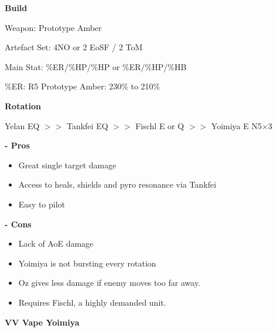 \documentclass[11pt]{article}
\begin{document}
\textbf{\small{Build}}

Weapon: Prototype Amber

Artefact Set: 4NO or 2 EoSF / 2 ToM

Main Stat: \%ER/\%HP/\%HP or \%ER/\%HP/\%HB

\%ER: R5 Prototype Amber: 230\% to 210\%

\textbf{\small{Rotation}} 

\begin{center}
    Yelan EQ $>>$ Tankfei EQ $>>$ Fischl E or Q $>>$ Yoimiya E N5$\times$3 
\end{center}

\textbf{\small{- Pros}}

\begin{itemize}
    \item Great single target damage
    \item Access to heals, shields and pyro resonance via Tankfei
    \item Easy to pilot
\end{itemize}

\textbf{\small{- Cons}}

\begin{itemize}
    \item Lack of AoE damage 
    \item Yoimiya is not bursting every rotation
    \item Oz gives less damage if enemy moves too far away. 
    \item Requires Fischl, a highly demanded unit. 
\end{itemize}

\newpage
\textbf{VV Vape Yoimiya}
\end{document}
